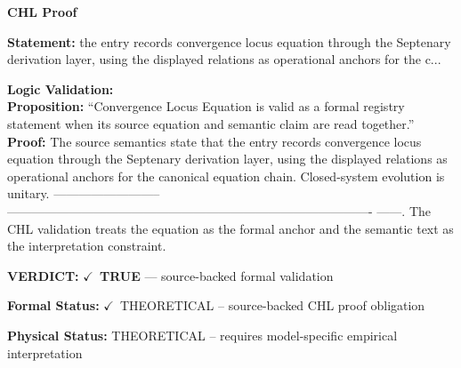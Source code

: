 \vspace{0.45em}
\noindent\textbf{CHL Proof}\par
\textbf{Statement:} the entry records convergence locus equation through the Septenary derivation layer,
using the displayed relations as operational anchors for the c...

\textbf{Logic Validation:}\\
\textbf{Proposition:} ``Convergence Locus Equation is valid as a formal registry statement when its source
equation and semantic claim are read together.''\\
\textbf{Proof:} The source semantics state that the entry records convergence locus equation through the
Septenary derivation layer, using the displayed relations as operational anchors for the
canonical equation chain. Closed-system evolution is unitary. --------------------------
----------------------------------------------------------------------------------------
------. The CHL validation treats the equation as the formal anchor and the semantic
text as the interpretation constraint.

\textbf{VERDICT:} \ensuremath{\checkmark}\ \textbf{TRUE} --- source-backed formal validation

\textbf{Formal Status:} \ensuremath{\checkmark}\ THEORETICAL -- source-backed CHL proof obligation

\textbf{Physical Status:} THEORETICAL -- requires model-specific empirical interpretation
\par\vspace{0.45em}
\par
\ifTZPDarkEdition
{}
\fi
\endgroup
\endgroup
